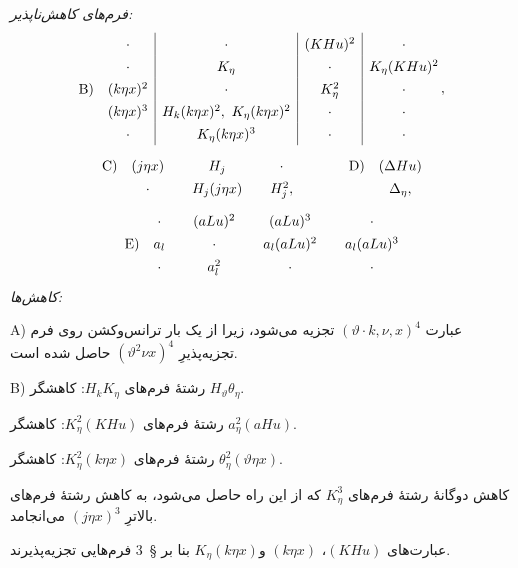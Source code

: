 \documentclass[11pt]{article}
\providecommand{\A}{\Delta}
\begin{document}
\noindent\emph{فرم‌های کاهش‌ناپذیر:}
\[
\renewcommand{\arraystretch}{1.35}
\begin{array}{@{}r@{\quad}c|c|c|c@{}}
&\cdot&\cdot&(KHu)^2&\cdot\\
&\cdot&K_\eta&\cdot&K_\eta(KHu)^2\\
\text{B)}&(k\eta x)^2&\cdot&K_\eta^2&\cdot\\
&(k\eta x)^3&H_k(k\eta x)^2,\ K_\eta(k\eta x)^2&\cdot&\cdot\\
&\cdot&K_\eta(k\eta x)^3&\cdot&\cdot
\end{array}\, ,
\]
\[
\renewcommand{\arraystretch}{1.35}
\begin{array}{@{}r@{\quad}c@{\qquad}c@{\qquad}c@{\qquad\qquad}r@{\quad}c@{}}
\text{C)}&(j\eta x)&H_j&\cdot&\text{D)}&(\A Hu)\\
&\cdot&H_j(j\eta x)&H_j^2,&&\A_\eta,
\end{array}
\]
\[
\renewcommand{\arraystretch}{1.35}
\begin{array}{@{}r@{\quad}c@{\qquad}c@{\qquad}c@{\qquad}c@{}}
&\cdot&(aLu)^2&(aLu)^3&\cdot\\
\text{E)}&a_l&\cdot&a_l(aLu)^2&a_l(aLu)^3\\
&\cdot&a_l^2&\cdot&\cdot
\end{array}
\]
\noindent\emph{کاهش‌ها:}

\noindent A) عبارت $(\vartheta\cdot k,\nu,x)^4$ تجزیه می‌شود، زیرا از یک بار ترانس‌وکشن روی فرم تجزیه‌پذیرِ $(\vartheta^2\nu x)^4$ حاصل شده است.

\noindent B) رشتهٔ فرم‌های $H_kK_\eta$: کاهشگر $H_\vartheta\theta_\eta$.

رشتهٔ فرم‌های $K_\eta^2(KHu)$: کاهشگر $a_\eta^2(aHu)$.

رشتهٔ فرم‌های $K_\eta^2(k\eta x)$: کاهشگر $\theta_\eta^2(\vartheta\eta x)$.

کاهش دوگانهٔ رشتهٔ فرم‌های $K_\eta^3$ که از این راه حاصل می‌شود، به کاهش رشتهٔ فرم‌های بالاترِ $(j\eta x)^3$ می‌انجامد.

عبارت‌های $(KHu)$، $(k\eta x)$ و$K_\eta(k\eta x)$ بنا بر \S\ 3 فرم‌هایی تجزیه‌پذیرند.
\end{document}
